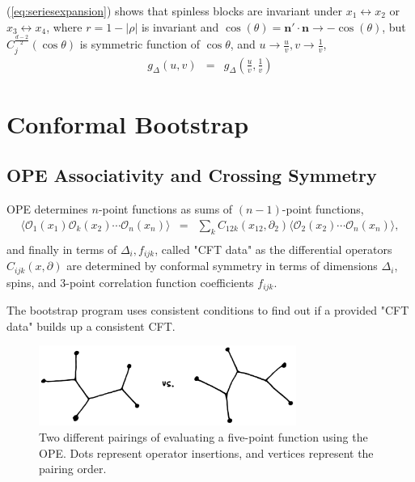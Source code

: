 \documentclass[12pt]{article}
\numberwithin{equation}{section}
\newcommand\be{\begin{eqnarray}}
\newcommand\ee{\end{eqnarray}}
\newcommand\cO{\mathcal{O}}
\newcommand\p[1]{\left(#1\right)}
\newcommand\ptl\partial
\newcommand\<\langle
\renewcommand\>\rangle
\newcommand\nn{\nonumber}
\renewcommand\.{\cdot}
\newcommand\De{\Delta}
\newcommand\bn{\mathbf{n}}
\renewcommand\th{\theta}
\begin{document}

(\ref{eq:seriesexpansion}) shows that spinless blocks are invariant under $x_1\leftrightarrow x_2$ or $x_3\leftrightarrow x_4$, where $r = 1-|\rho|$ is invariant and $\cos(\th) = \bn'\.\bn\rightarrow-\cos(\th)$, but $C^{\frac{d-2}{2}}_{j}(\cos\th)$ is symmetric function of $\cos\th$, and $u\rightarrow\frac u v,v\rightarrow\frac 1 v$,
\be
\label{eq:invariantunderonetwo}
g_{\De}(u,v) &=& g_{\De}\p{\frac{u}{v},\frac 1 v}
\ee


\section{Conformal Bootstrap}
\subsection{OPE Associativity and Crossing Symmetry}

OPE determines $n$-point functions as sums of $(n-1)$-point functions,
\be
\label{eq:usingOPEtoreducecorrelator}
\<\cO_1(x_1)\cO_k(x_2)\cdots\cO_n(x_n)\> &=& \sum_k C_{12k}(x_{12},\ptl_2)\<\cO_2(x_2)\cdots\cO_n(x_n)\>,\nn\\
\ee
and finally in terms of $\De_i,f_{ijk}$, called "CFT data" as the differential operators $C_{ijk}(x,\ptl)$ are determined by conformal symmetry in terms of dimensions $\De_i$, spins, and 3-point correlation function coefficients $f_{ijk}$.

The bootstrap program uses consistent conditions to find out if a provided "CFT data" builds up a consistent CFT.

\begin{figure}[h]
\begin{center}
\includegraphics[width=0.75\textwidth]{opedifferentways.jpg}
\end{center}
\caption{Two different pairings of evaluating a five-point function using the OPE\@.  Dots represent operator insertions, and vertices represent the pairing order.\label{fig:opedifferentways}}
\end{figure}
\end{document}
